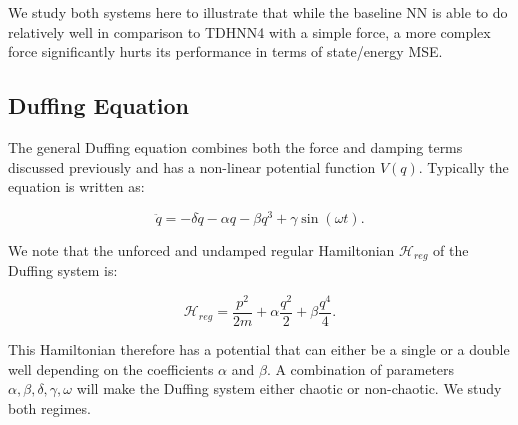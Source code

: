 \documentclass{article}
\begin{document}
We study both systems here to illustrate that while the baseline NN is able to do relatively well in comparison to TDHNN4 with a simple force, a more complex force significantly hurts its performance in terms of state/energy MSE.

\subsection{Duffing Equation}

The general Duffing equation combines both the force and damping terms discussed previously and has a non-linear potential function $V(q)$. Typically the equation is written as:

\begin{equation}
\ddot{q} = -\delta \dot{q} -\alpha q -\beta q^3 +\gamma \sin(\omega t). 
\end{equation}

We note that the unforced and undamped regular Hamiltonian $\mathcal{H}_{reg}$ of the Duffing system is:

\begin{equation}
\mathcal{H}_{reg} = \frac{p^2}{2m}+ \alpha \frac{q^2}{2} + \beta \frac{q^4}{4}.
\end{equation}

This Hamiltonian therefore has a potential that can either be a single or a double well depending on the coefficients $\alpha$ and $\beta$. A combination of parameters $\alpha,\beta,\delta,\gamma,\omega$ will make the Duffing system either chaotic or non-chaotic. We study both regimes.
\end{document}
